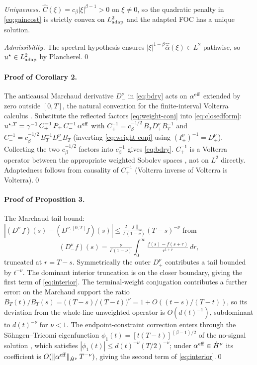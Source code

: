 \documentclass[11pt]{article}
\newcommand{\adap}{{\rm adap}}
\newcommand{\eff}{{\rm eff}}
\theoremstyle{plain}
\begin{document}
\emph{Uniqueness.} $\hat C(\xi) = c_\beta|\xi|^{\beta-1}>0$ on $\xi\ne 0$, so the quadratic penalty in \eqref{eq:gaincost} is strictly convex on $L^2_{\adap}$ and the adapted FOC has a unique solution.

\emph{Admissibility.} The spectral hypothesis ensures $|\xi|^{1-\beta}\widehat{\bar\alpha}(\xi)\in L^2$ pathwise, so $u^\star\in L^2_{\adap}$ by Plancherel.\qed

\paragraph{Proof of Corollary 2.} The anticausal Marchaud derivative $D_-^\nu$ in \eqref{eq:bdry} acts on $\alpha^{\eff}$ extended by zero outside $[0,T]$, the natural convention for the finite-interval Volterra calculus \citep[\S13.5]{SamkoKilbasMarichev1993}. Substitute the reflected factors \eqref{eq:weight-conj} into \eqref{eq:closedform}: $u^{\star,T} = \gamma^{-1}\,C_+^{-1}\,P_+\,C_-^{-1}\,\alpha^{\eff}$ with $C_+^{-1} = c_\beta^{-1/2}\, B_T D_+^\nu B_T^{-1}$ and $C_-^{-1} = c_\beta^{-1/2}\, B_T^{-1} D_-^\nu B_T$ (inverting \eqref{eq:weight-conj} using $(I_\pm^\nu)^{-1} = D_\pm^\nu$). Collecting the two $c_\beta^{-1/2}$ factors into $c_\beta^{-1}$ gives \eqref{eq:bdry}. $C_+^{-1}$ is a Volterra operator between the appropriate weighted Sobolev spaces \citep[\S13.5]{SamkoKilbasMarichev1993}, not on $L^2$ directly. Adaptedness follows from causality of $C_+^{-1}$ (Volterra inverse of Volterra is Volterra).\qed

\paragraph{Proof of Proposition 3.} The Marchaud tail bound: $|(D_-^\nu f)(s) - (D_-^{\nu,[0,T]}f)(s)| \le \tfrac{2\|f\|_\infty}{\Gamma(1-\nu)}(T-s)^{-\nu}$ from
\[
(D_-^\nu f)(s) = \tfrac{\nu}{\Gamma(1-\nu)}\!\int_0^\infty \tfrac{f(s)-f(s+r)}{r^{1+\nu}}\,dr,
\]
truncated at $r = T-s$. Symmetrically the outer $D_+^\nu$ contributes a tail bounded by $t^{-\nu}$. The dominant interior truncation is on the closer boundary, giving the first term of \eqref{eq:interior}. The terminal-weight conjugation contributes a further error: on the Marchaud support the ratio $B_T(t)/B_T(s) = \bigl((T-s)/(T-t)\bigr)^{\nu} = 1 + O((t-s)/(T-t))$, so its deviation from the whole-line unweighted operator is $O(d(t)^{-1})$, subdominant to $d(t)^{-\nu}$ for $\nu<1$. The endpoint-constraint correction enters through the S\"ohngen--Tricomi eigenfunction $\phi_1(t) = [t(T-t)]^{(\beta-1)/2}$ of the no-signal solution \citep{GatheralSchiedSlynko2012,FordeSanchezSmith2022}, which satisfies $|\phi_1(t)|\le d(t)^{-\nu}(T/2)^{-\nu}$; under $\alpha^{\eff}\in\dot H^\nu$ its coefficient is $O(\|\alpha^{\eff}\|_{\dot H^\nu}\,T^{-\nu})$, giving the second term of \eqref{eq:interior}.\qed
\end{document}
